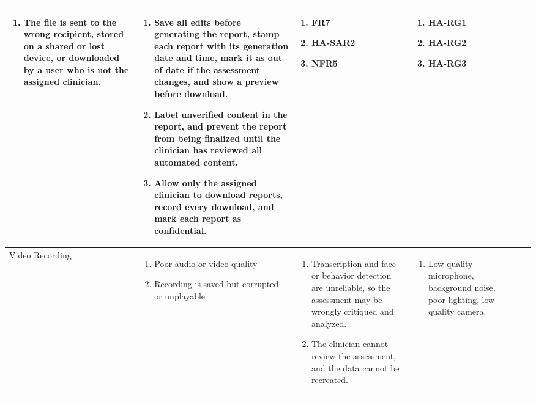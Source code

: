 \documentclass{article}
\begin{document}
\begin{landscape}
\begin{longtable}{|p{2.4cm}|p{3.2cm}|p{4cm}|p{3.6cm}|p{4.8cm}|p{1.8cm}|p{2.2cm}|}
\begin{enumerate}[leftmargin=*]
       \item The file is sent to the wrong recipient, stored on a shared or lost device, or downloaded by a user who is not the assigned clinician.
  \end{enumerate} &
  \begin{enumerate}[leftmargin=*]
       \item Save all edits before generating the report, stamp each report with its generation date and time, mark it as out of date if the assessment changes, and show a preview before download.
       \item Label unverified content in the report, and prevent the report from being finalized until the clinician has reviewed all automated content.
       \item Allow only the assigned clinician to download reports, record every download, and mark each report as confidential.
  \end{enumerate} &
  \begin{enumerate}[leftmargin=*]
       \item FR7
       \item HA-SAR2
       \item NFR5
  \end{enumerate} &
  \begin{enumerate}[leftmargin=*]
       \item HA-RG1
       \item HA-RG2
       \item HA-RG3
  \end{enumerate} \\
  \hline
  Video Recording & 
  \begin{enumerate}[leftmargin=*]
      \item Poor audio or video quality
      \item Recording is saved but corrupted or unplayable
  \end{enumerate} & 
  \begin{enumerate}[leftmargin=*]
      \item Transcription and face or behavior detection are unreliable, so the assessment may be wrongly critiqued and analyzed.
      \item The clinician cannot review the assessment, and the data cannot be recreated.
  \end{enumerate} &
  \begin{enumerate}[leftmargin=*]
       \item Low-quality microphone, background noise, poor lighting, low-quality camera.

\end{enumerate}
\end{longtable}
\end{landscape}
\end{document}
